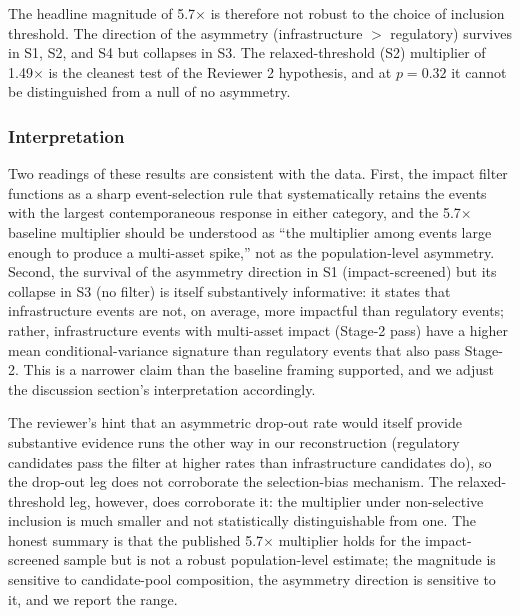 \documentclass[pdflatex,sn-mathphys-num]{sn-jnl}
\theoremstyle{thmstyleone}
\theoremstyle{thmstyletwo}
\theoremstyle{thmstylethree}
\begin{document}
The headline magnitude of 5.7$\times$ is therefore not robust to the choice of inclusion threshold. The direction of the asymmetry (infrastructure $>$ regulatory) survives in S1, S2, and S4 but collapses in S3. The relaxed-threshold (S2) multiplier of 1.49$\times$ is the cleanest test of the Reviewer 2 hypothesis, and at $p = 0.32$ it cannot be distinguished from a null of no asymmetry.

\subsubsection{Interpretation}

Two readings of these results are consistent with the data. First, the impact filter functions as a sharp event-selection rule that systematically retains the events with the largest contemporaneous response in either category, and the 5.7$\times$ baseline multiplier should be understood as ``the multiplier among events large enough to produce a multi-asset spike,'' not as the population-level asymmetry. Second, the survival of the asymmetry direction in S1 (impact-screened) but its collapse in S3 (no filter) is itself substantively informative: it states that infrastructure events are not, on average, more impactful than regulatory events; rather, infrastructure events with multi-asset impact (Stage-2 pass) have a higher mean conditional-variance signature than regulatory events that also pass Stage-2. This is a narrower claim than the baseline framing supported, and we adjust the discussion section's interpretation accordingly.

The reviewer's hint that an asymmetric drop-out rate would itself provide substantive evidence runs the other way in our reconstruction (regulatory candidates pass the filter at higher rates than infrastructure candidates do), so the drop-out leg does not corroborate the selection-bias mechanism. The relaxed-threshold leg, however, does corroborate it: the multiplier under non-selective inclusion is much smaller and not statistically distinguishable from one. The honest summary is that the published 5.7$\times$ multiplier holds for the impact-screened sample but is not a robust population-level estimate; the magnitude is sensitive to candidate-pool composition, the asymmetry direction is sensitive to it, and we report the range.

\end{document}
